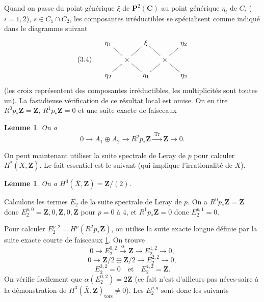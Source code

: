 \documentclass[12pt]{amsart}
\theoremstyle{plain}
\newtheorem{lemme}[theoreme]{Lemme}
\theoremstyle{definition}
\theoremstyle{remark}
\DeclareMathOperator{\Tr}{Tr}
\begin{document}
Quand on passe du point g\'en\'erique $\xi$ de $\mathbf{P}^2(\mathbf{C})$ au point g\'en\'erique $\eta_i$ de
$C_i$ ($i = 1,2$), $s \in C_1 \cap C_2$, les composantes irr\'eductibles se sp\'ecialisent comme
indiqu\'e dans le diagramme suivant
\begin{equation}\label{eq:3.4}
\xymatrix@R=8pt@C=12pt{
& \eta_1 \ar@{-}[rd] & & \xi \ar@{-}[ld] \ar@{-}[rd] & & \eta_2 \ar@{-}[ld] \\
(3.4) & & \times & & \times & \\
& \eta_2 \ar@{-}[ru] & & \eta_1 \ar@{-}[lu] \ar@{-}[ru] & & \eta_2 \ar@{-}[lu]
}
\end{equation}
(les croix repr\'esentent des composantes irr\'eductibles, les multiplicit\'es sont
toutes un). La fastidieuse v\'erification de ce r\'esultat local est omise. On en tire
$R^0 p_* \mathbf{Z} = \mathbf{Z}$, $R^1 p_* \mathbf{Z} = 0$ et une suite exacte de faisceaux

\begin{lemme}\label{lem:3.5}
On a
\[
0 \longrightarrow A_1 \oplus A_2 \longrightarrow R^2 p_* \mathbf{Z} \xrightarrow{\;\Tr\;} \mathbf{Z} \longrightarrow 0.
\]
\end{lemme}

On peut maintenant utiliser la suite spectrale de Leray de $p$ pour calculer
$H^*(\bar{X}, \mathbf{Z})$. Le fait essentiel est le suivant (qui implique l'irrationalit\'e de $X$).

\begin{lemme}\label{lem:3.6}
On a $H^3(\bar{X}, \mathbf{Z}) = \mathbf{Z}/(2)$.
\end{lemme}

Calculons les termes $E_2$ de la suite spectrale de Leray de $p$. On a
$R^0 p_* \mathbf{Z} = \mathbf{Z}$ donc $E_2^{p,0} = \mathbf{Z}, 0, \mathbf{Z}, 0, \mathbf{Z}$ pour $p = 0$ \`a $4$,
et $R^1 p_* \mathbf{Z} = 0$ donc $E_2^{p,1} = 0$.

Pour calculer $E_2^{p,2} = H^p(R^2 p_* \mathbf{Z})$, on utilise la suite exacte longue d\'efinie par
la suite exacte courte de faisceaux \ref{lem:3.5}. On trouve
\[
0 \longrightarrow E_2^{0,2} \xrightarrow{\;\alpha\;} \mathbf{Z} \longrightarrow E_2^{1,2} \longrightarrow 0,
\]
\[
0 \longrightarrow \mathbf{Z}/2 \oplus \mathbf{Z}/2 \longrightarrow E_2^{2,2} \longrightarrow 0,
\]
\[
E_2^{3,2} = 0 \quad \text{et} \quad E_2^{4,2} = \mathbf{Z}.
\]
On v\'erifie facilement que $\alpha(E_2^{0,2}) = 2\mathbf{Z}$ (ce fait n'est d'ailleurs pas n\'eces-\linebreak saire \`a la d\'emonstration de $H^3(\bar{X}, \mathbf{Z})_{\text{tors}} \neq 0$). Les $E_2^{p,q}$ sont donc les suivants
\end{document}
